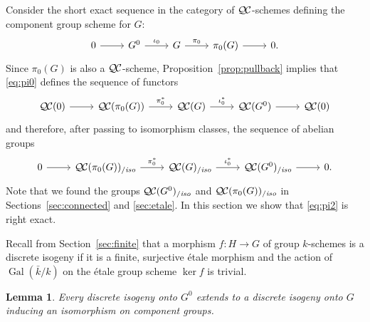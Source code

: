 \documentclass[11pt]{amsart}
\theoremstyle{plain}
\newtheorem{lemma}[theorem]{Lemma}
\theoremstyle{definition}
\theoremstyle{remark}
\newcommand{\bFq}{\bar{k}}
\newcommand{\Fq}{k}
\DeclareMathOperator{\Gal}{Gal}
\newcommand{\QC}{{\mathcal{Q\hskip-0.8pt C}}}
\newcommand{\QCiso}[1]{\QC(#1)_{/\textit{iso}}}
\begin{document}
Consider the short exact sequence in the category of $\QC$-schemes
defining the component group scheme for $G$:
\begin{equation}\label{eq:pi0}
\begin{tikzcd}
0 \rar & G^0 \arrow{r}{\iota_0} & G \arrow{r}{\pi_0} & \pi_0(G) \rar & 0.
\end{tikzcd}
\end{equation}
Since $\pi_0(G)$ is also a $\QC$-scheme, 
Proposition~\ref{prop:pullback} implies that \eqref{eq:pi0} defines the sequence of functors
\begin{equation}\label{eq:pi1}
\begin{tikzcd}
\QC(0) \rar & \QC(\pi_0(G)) \arrow{r}{\pi_0^*} & \QC(G) \arrow{r}{\iota_0^*} & \QC(G^0) \rar & \QC(0)
\end{tikzcd}
\end{equation}
and therefore, after passing to isomorphism classes, the sequence of abelian groups 
\begin{equation}\label{eq:pi2}
\begin{tikzcd}
0 \rar & \QCiso{\pi_0(G)} \arrow{r}{\pi_0^*} & \QCiso{G} \arrow{r}{\iota_0^*} & \QCiso{G^0} \rar & 0.
\end{tikzcd}
\end{equation}
 Note that we found the groups $\QCiso{G^0}$
and $\QCiso{\pi_0(G)}$
in Sections~\ref{sec:connected} and \ref{sec:etale}.
In this section we show that \eqref{eq:pi2} is right exact.

Recall from Section~\ref{sec:finite} that 
a morphism $f : H\to G$ of group $\Fq$-schemes is a discrete isogeny 
if it is a finite, surjective \'etale morphism and 
the action of $\Gal(\bFq/\Fq)$ on the \'etale group scheme $\ker f$ is trivial.

\begin{lemma}\label{lemma:ext}
Every discrete isogeny onto $G^0$ extends to a discrete
isogeny onto $G$ inducing an isomorphism on component groups.
\end{lemma}
\end{document}
